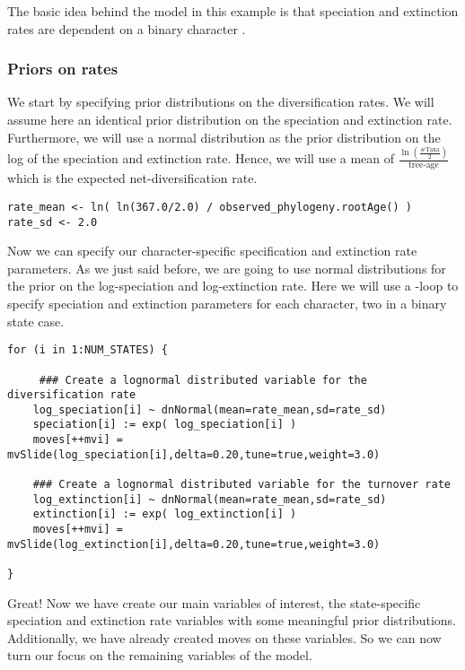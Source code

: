The basic idea behind the model in this example is that speciation and extinction rates are dependent on a binary character \citep{Maddison2007}.


\subsubsection{Priors on rates}
We start by specifying prior distributions on the diversification rates.
We will assume here an identical prior distribution on the speciation and extinction rate.
Furthermore, we will use a normal distribution as the prior distribution on the log of the speciation and extinction rate.
Hence, we will use a mean of $\frac{\ln(\frac{\text{\#Taxa}}{2})}{\text{tree-age}}$ which is the expected net-diversification rate.
{\tt \begin{snugshade*}
\begin{lstlisting}
rate_mean <- ln( ln(367.0/2.0) / observed_phylogeny.rootAge() )
rate_sd <- 2.0
\end{lstlisting}
\end{snugshade*}}
Now we can specify our character-specific specification and extinction rate parameters.
As we just said before, we are going to use normal distributions for the prior on the log-speciation and log-extinction rate.
Here we will use a -loop to specify speciation and extinction parameters for each character, \EG two in a binary state case.
{\tt \begin{snugshade*}
\begin{lstlisting}
for (i in 1:NUM_STATES) {
    
     ### Create a lognormal distributed variable for the diversification rate
    log_speciation[i] ~ dnNormal(mean=rate_mean,sd=rate_sd) 
    speciation[i] := exp( log_speciation[i] )
    moves[++mvi] = mvSlide(log_speciation[i],delta=0.20,tune=true,weight=3.0)

    ### Create a lognormal distributed variable for the turnover rate
    log_extinction[i] ~ dnNormal(mean=rate_mean,sd=rate_sd) 
    extinction[i] := exp( log_extinction[i] )
    moves[++mvi] = mvSlide(log_extinction[i],delta=0.20,tune=true,weight=3.0)

}
\end{lstlisting}
\end{snugshade*}}
Great! Now we have create our main variables of interest, the state-specific speciation and extinction rate variables with some meaningful prior distributions. 
Additionally, we have already created moves on these variables.
So we can now turn our focus on the remaining variables of the model.


